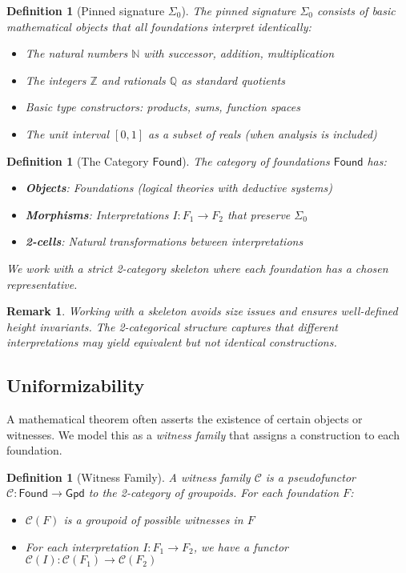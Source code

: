 \documentclass[11pt]{article}
\newtheorem{definition}[theorem]{Definition}
\newtheorem{remark}[theorem]{Remark}
\newcommand{\N}{\mathbb{N}}
\newcommand{\Found}{\mathsf{Found}}
\newcommand{\Gpd}{\mathsf{Gpd}}
\newcommand{\SigmaZero}{\Sigma_{0}}
\begin{document}
\begin{definition}[Pinned signature \(\SigmaZero\)]
The \emph{pinned signature} $\SigmaZero$ consists of basic mathematical objects that all foundations interpret identically:
\begin{itemize}
\item The natural numbers $\N$ with successor, addition, multiplication
\item The integers $\mathbb{Z}$ and rationals $\mathbb{Q}$ as standard quotients
\item Basic type constructors: products, sums, function spaces
\item The unit interval $[0,1]$ as a subset of reals (when analysis is included)
\end{itemize}
\end{definition}

\begin{definition}[The Category \(\Found\)]
The \emph{category of foundations} $\Found$ has:
\begin{itemize}
\item \textbf{Objects}: Foundations (logical theories with deductive systems)
\item \textbf{Morphisms}: Interpretations $I: F_1 \to F_2$ that preserve $\SigmaZero$
\item \textbf{2-cells}: Natural transformations between interpretations
\end{itemize}
We work with a strict 2-category skeleton where each foundation has a chosen representative.
\end{definition}

\begin{remark}
Working with a skeleton avoids size issues and ensures well-defined height invariants. The 2-categorical structure captures that different interpretations may yield equivalent but not identical constructions.
\end{remark}

\subsection{Uniformizability}

A mathematical theorem often asserts the existence of certain objects or witnesses. We model this as a \emph{witness family} that assigns a construction to each foundation.

\begin{definition}[Witness Family]
A \emph{witness family} $\mathcal{C}$ is a pseudofunctor $\mathcal{C}: \Found \to \Gpd$ to the 2-category of groupoids. For each foundation $F$:
\begin{itemize}
\item $\mathcal{C}(F)$ is a groupoid of possible witnesses in $F$
\item For each interpretation $I: F_1 \to F_2$, we have a functor $\mathcal{C}(I): \mathcal{C}(F_1) \to \mathcal{C}(F_2)$
\end{itemize}
\end{definition}
\end{document}
